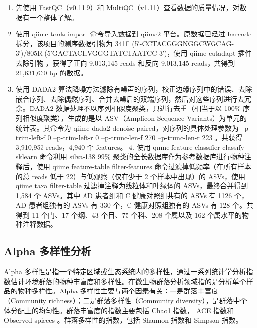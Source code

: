 \documentclass[supercite]{HustGraduPaper}
\begin{document}
\begin{enumerate}
	\item 先使用 FastQC（v0.11.9）和 MultiQC\cite{ewels2016multiqc}（v1.11）查看数据的质量情况，对数据有一个整体了解。
	\item 使用 qiime tools import 命令导入数据到 qiime2 平台。原数据已经过 barcode 拆分，该项目的测序数据引物为 341F (5′-CCTACGGGNGGCWGCAG-3′)/805R (5′GACTACHVGGGTATCTAATCC-3′)，使用 qiime cutadapt 插件\cite{cutadapt}去除引物 ，获得了正向 9,013,145 reads 和反向 9,013,145 reads，共得到 21,631,630 bp 的数据。
	\item 使用 DADA2 算法\cite{dada2}降噪方法滤除有噪声的序列，校正边缘序列中的错误、去除嵌合序列、去除偶然序列、合并去噪后的双端序列，然后对这些序列进行去冗余。DADA2 数据处理不以序列相似度聚类，只进行去重（相当于以 100\% 序列相似度聚类），生成的是以 ASV（Amplicon Sequence Variants）为单元的统计表。其命令为 qiime dada2 denoise-paired，对序列的具体处理参数为 --p-trim-left-f 0 --p-trim-left-r 0 --p-trunc-len-f 270  --p-trunc-len-r 223 。共获得 3,910,953 reads，4,940 个 features。
	4. 使用 qiime feature-classifier classify-sklearn 命令利用 silva-138 99\% 聚类的全长数据库\cite{silva}作为参考数据库进行物种注释后，使用 qiime feature-table filter-features 命令过滤掉低频率（在所有样本的总 reads 低于 22）与低观察（仅在少于 2 个样本中出现）的 ASVs，使用 qiime taxa filter-table 过滤掉注释为线粒体和叶绿体的 ASVs，最终合并得到 1,584 个 ASVs。其中 AD 患者组和 C 健康对照组共有的 ASVs 有 1126 个，AD 患者组独有的 ASVs 有 330 个，C 健康对照组独有的 ASVs 有 128 个。共得到 11 个门、17 个纲、43 个目、75 个科、208 个属以及 162 个属水平的物种注释数据。
\end{enumerate}


\subsection{Alpha 多样性分析}

Alpha 多样性是指一个特定区域或生态系统内的多样性，通过一系列统计学分析指数估计环境群落的物种丰富度和多样性。在微生物群落分析领域指的是分析单个样品的物种多样性。Alpha 多样性主要与两个因素有关：一是群落丰富度（Community richness）；二是群落多样性（Community diversity），是群落中个体分配上的均匀性。群落丰富度的指数主要包括 Chao1 指数， ACE 指数和 Observed spieces 。群落多样性的指数，包括 Shannon 指数和 Simpson 指数。
\end{document}
